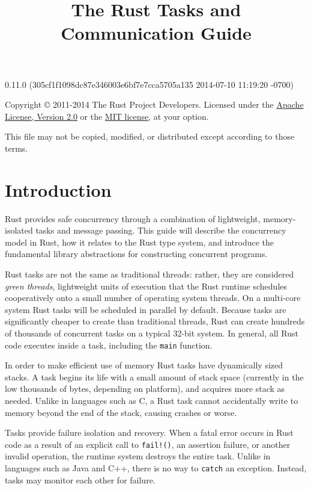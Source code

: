 \documentclass[]{article}
\title{The Rust Tasks and Communication Guide}
\begin{document}
\maketitle

0.11.0 (305cf1f1098dc87e346003e6bf7e7cca5705a135 2014-07-10 11:19:20 -0700)

Copyright © 2011-2014 The Rust Project Developers. Licensed under the
\href{http://www.apache.org/licenses/LICENSE-2.0}{Apache License,
Version 2.0} or the \href{http://opensource.org/licenses/MIT}{MIT
license}, at your option.

This file may not be copied, modified, or distributed except according
to those terms.

{
\hypersetup{linkcolor=black}
\setcounter{tocdepth}{3}
\tableofcontents
}
\section{Introduction}\label{introduction}

Rust provides safe concurrency through a combination of lightweight,
memory-isolated tasks and message passing. This guide will describe the
concurrency model in Rust, how it relates to the Rust type system, and
introduce the fundamental library abstractions for constructing
concurrent programs.

Rust tasks are not the same as traditional threads: rather, they are
considered \emph{green threads}, lightweight units of execution that the
Rust runtime schedules cooperatively onto a small number of operating
system threads. On a multi-core system Rust tasks will be scheduled in
parallel by default. Because tasks are significantly cheaper to create
than traditional threads, Rust can create hundreds of thousands of
concurrent tasks on a typical 32-bit system. In general, all Rust code
executes inside a task, including the \texttt{main} function.

In order to make efficient use of memory Rust tasks have dynamically
sized stacks. A task begins its life with a small amount of stack space
(currently in the low thousands of bytes, depending on platform), and
acquires more stack as needed. Unlike in languages such as C, a Rust
task cannot accidentally write to memory beyond the end of the stack,
causing crashes or worse.

Tasks provide failure isolation and recovery. When a fatal error occurs
in Rust code as a result of an explicit call to \texttt{fail!()}, an
assertion failure, or another invalid operation, the runtime system
destroys the entire task. Unlike in languages such as Java and C++,
there is no way to \texttt{catch} an exception. Instead, tasks may
monitor each other for failure.
\end{document}
